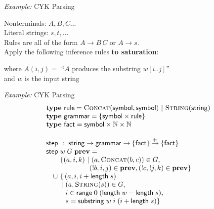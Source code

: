 \documentclass{beamer}
\newcommand{\mto}{\overset{\textbf{+}\:}{\to}}
\newcommand{\m}[1]{\ensuremath{\mathbf{#1}}}
\newcommand{\ms}{\mathsf}
\newcommand{\N}{\mathbb{N}}
\newcommand{\x}{\times}
\begin{document}

\begin{frame}{{\it Example:} CYK Parsing}
  \large

  Nonterminals: $A, B, C...$\\
  Literal strings: ${s}, {t}, ...$\vspace{1em}\\
  Rules are all of the form $A \to B\,C$ or $A \to {s}$.\pause
  \vspace{1em}\\

  Apply the following inference rules \textbf{to saturation}:\pause
  \vspace{0.5em}
  \Large{}

  \vspace{0.5em}\large

  where $A(i,j) =$ ``$A$ produces the substring $w[i..j]$''\\
  and $w$ is the input string
\end{frame}

\begin{frame}{{\it Example:} CYK Parsing}
  \[\begin{array}{l}
    \textbf{type}~\ms{rule} = \textsc{Concat}(\ms{symbol}, \ms{symbol})
    ~|~ \textsc{String}(\ms{string})\\
    \textbf{type}~\ms{grammar} = \{\ms{symbol} \times \ms{rule}\}\\
    \textbf{type}~\ms{fact} = \ms{symbol} \x \N \x \N\\
    \\
    \ms{step} ~:~ \ms{string} \to \ms{grammar} \to \{\ms{fact}\} \mto \{\ms{fact}\}\\
    \ms{step}\; w\; G\; \m{prev} =\\
    \quad \phantom{\cup}~\{ (a,i,k) ~|~ (a, \textsc{Concat}(b,c)) \in G,\\
    \quad \phantom{\cup}~\hspace{4.24em} (!b,i,j) \in \m{prev},
                   (!c,!j,k) \in \m{prev} \}\\
    \quad\cup~ \{ \, (a, i, i + \ms{length}\;s)\\
    \quad\phantom{\cup}\,~|~ (a, \textsc{String}(s)) \in G,\\
    \quad\phantom{\cup\,~|~} i \in \ms{range}\; 0\; (\ms{length}\; w - \ms{length}\; s),\\
    \quad\phantom{\cup\,~|~} s = \ms{substring}\; w\; i\; (i + \ms{length}\; s) \}
  \end{array}\]
\end{frame}
\end{document}
